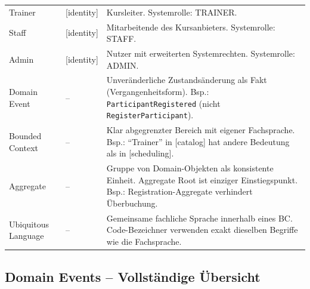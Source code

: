 \begin{longtable}{L{3cm} L{2cm} p{\dimexpr\linewidth-5cm-6\tabcolsep\relax}}
  Trainer & [identity] & Kursleiter. Systemrolle: TRAINER. \\
  Staff & [identity] & Mitarbeitende des Kursanbieters. Systemrolle: STAFF. \\
  Admin & [identity] & Nutzer mit erweiterten Systemrechten. Systemrolle: ADMIN. \\
  Domain Event & -- & Unveränderliche Zustandsänderung als Fakt (Vergangenheitsform). Bsp.: \texttt{ParticipantRegistered} (nicht \texttt{RegisterParticipant}). \\
  Bounded Context & -- & Klar abgegrenzter Bereich mit eigener Fachsprache. Bsp.: ``Trainer'' in [catalog] hat andere Bedeutung als in [scheduling]. \\
  Aggregate & -- & Gruppe von Domain-Objekten als konsistente Einheit. Aggregate Root ist einziger Einstiegspunkt. Bsp.: Registration-Aggregate verhindert Überbuchung. \\
  Ubiquitous Language & -- & Gemeinsame fachliche Sprache innerhalb eines BC. Code-Bezeichner verwenden exakt dieselben Begriffe wie die Fachsprache. \\
\end{longtable}

\subsection{Domain Events -- Vollständige Übersicht}

